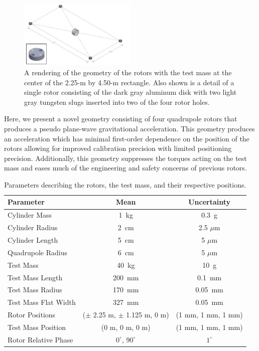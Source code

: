 \documentclass[superscriptaddress, twocolumn, prd]{revtex4-1}
\begin{document}
\begin{figure}[!h]
\centering \includegraphics[width=0.5\textwidth]{Super4_Model.pdf}
\caption{A rendering of the geometry of the rotors with the test mass at the center of the 2.25-m by 4.50-m rectangle. Also shown is a detail of a single rotor consisting of the dark gray aluminum disk with two light gray tungsten slugs inserted into two of the four rotor holes.}
\label{cad} 
\end{figure}

Here, we present a novel geometry consisting of four quadrupole rotors that produces a pseudo plane-wave gravitational acceleration. This geometry produces an acceleration which has minimal first-order dependence on the position of the rotors allowing for improved calibration precision with limited positioning precision. Additionally, this geometry suppresses the torques acting on the test mass and eases much of the engineering and safety concerns of previous rotors.

\begin{widetext}
\begingroup
\setlength{\tabcolsep}{10pt} %
\renewcommand{\arraystretch}{1.5} %

\begin{table}[h!]
\begin{center}
\begin{tabular}{ |l|c|c| }
\hline
 Parameter & Mean & Uncertainty \\
 \hline
Cylinder Mass & 1~kg & 0.3~g \\
Cylinder Radius & 2~cm & 2.5 $\mu$m \\
Cylinder Length & 5~cm & 5 $\mu$m \\
Quadrupole Radius & 6~cm & 5 $\mu$m \\
Test Mass & 40~kg & 10~g \\
Test Mass Length & 200~mm & 0.1~mm\\
Test Mass Radius & 170~mm & 0.05~mm\\
Test Mass Flat Width & 327~mm & 0.05~mm\\
Rotor Positions & ($\pm$ 2.25 m, $\pm$ 1.125 m, 0 m) & (1 mm, 1 mm, 1 mm) \\
Test Mass Position & (0 m, 0 m, 0 m) & (1 mm, 1 mm, 1 mm) \\
Rotor Relative Phase & $0^\circ$, $90^\circ$ & $1^\circ$ \\
 \hline

 \end{tabular}
 \caption{Parameters describing the rotors, the test mass, and their respective positions.}\label{param}
 \end{center}

\end{table}
\endgroup
\end{widetext}
\end{document}
